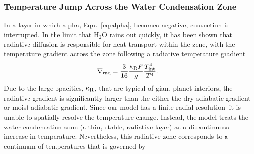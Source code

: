 \documentclass[11pt]{ucscthesisbs}
\begin{document}
\subsubsection{Temperature Jump Across the Water Condensation Zone}
In a layer in which alpha, Eqn.~\ref{eq:alpha}, becomes negative, convection is interrupted. In the limit that H$_{2}$O rains out quickly, \citep{friedson_2017,leconte_2017} it has been shown that radiative diffusion is responsible for heat transport within the zone, with the temperature gradient across the zone following a radiative temperature gradient \citep{kippenhahn_2012} 
\begin{align}
 \nabla_{\rm rad}= \frac{3}{16}\frac{\kappa_{\rm R} P}{g}\frac{T_{\rm int}^4}{T^4} .
  \label{eq:radiative_gradient}
\end{align}
Due to the large opacities, $\kappa_{\rm R}$, that are typical of giant planet interiors, the radiative gradient is significantly larger than the either the dry adiabatic gradient or moist adiabatic gradient. Since our model has a finite radial resolution, it is unable to spatially resolve the temperature change. Instead, the model treats the water condensation zone (a thin, stable, radiative layer) as a discontinuous increase in temperature. Nevertheless, this radiative zone corresponds to a continuum of temperatures that is governed by
\end{document}
